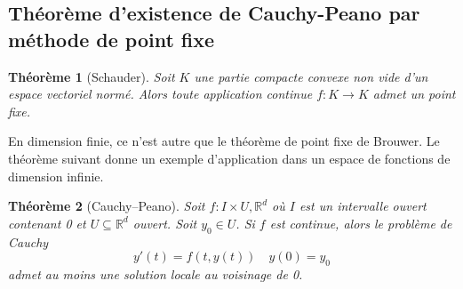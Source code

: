 \documentclass[a4paper, 11pt]{article}
\def\R{\mathbb{R}}
\newtheorem*{theorem}{Théorème}
\begin{document}
\newpage

\subsection{Théorème d'existence de Cauchy-Peano par méthode de point fixe}

\begin{theorem}[Schauder]
  Soit $K$ une partie compacte convexe non vide d'un espace vectoriel normé.
  Alors toute application continue $f : K \to K$ admet un point fixe.
\end{theorem}

En dimension finie, ce n'est autre que le théorème de point fixe de Brouwer. Le
théorème suivant donne un exemple d'application dans un espace de fonctions de
dimension infinie.

\begin{theorem}[Cauchy--Peano]
  Soit $f : I \times U, \R^d$ où $I$ est un intervalle ouvert contenant 0
  et $U \subseteq \R^d$ ouvert. Soit $y_0 \in U$.
  Si $f$ est \emph{continue}, alors le problème de Cauchy
  \[ y'(t) = f(t, y(t)) \quad y(0) = y_0\]
  admet au moins une solution locale au voisinage de 0.
\end{theorem}
\end{document}
